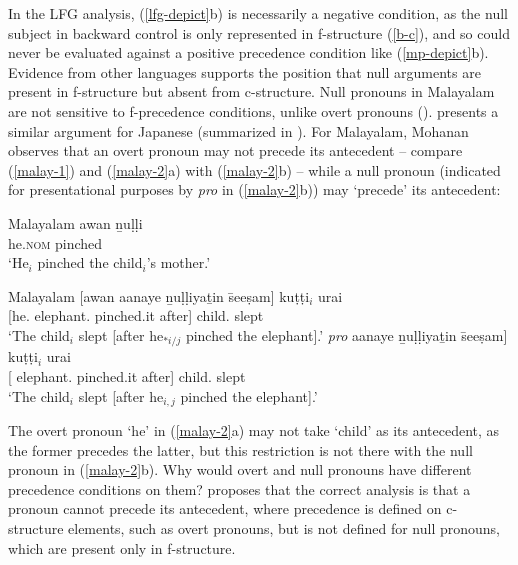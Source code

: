 \documentclass[output=paper,hidelinks]{langscibook}
\begin{document}
In the LFG analysis, (\ref{lfg-depict}b) is necessarily a negative
condition, as the null subject in backward control is only represented
in f-structure (\ref{b-c}), and so could never be evaluated against a
positive precedence condition like (\ref{mp-depict}b). Evidence from other
languages supports the position that null arguments are present in
f-structure but absent from c-structure. Null pronouns in Malayalam
are not sensitive to f-precedence conditions, unlike overt pronouns
(\citealp[664--665]{mohanan83}). \citet{kameyama85} presents a similar
argument for Japanese (summarized in \citealt[171ff.~and
  288ff.]{dalrymple01}). For Malayalam, Mohanan observes that an overt
pronoun may not precede its antecedent -- compare (\ref{malay-1}) and
(\ref{malay-2}a) with (\ref{malay-2}b) -- while a null pronoun (indicated
for presentational purposes by \textit{pro} in (\ref{malay-2}b)) may
`precede' its antecedent:

\ea\label{malay-1} Malayalam
\ea
{} awan \b{n}u\d{l}\d{l}i\\
[child.\textsc{gen} mother.\textsc{acc}] he.\textsc{nom} pinched\\
\glt `He$_i$ pinched the child$_i$’s mother.'
\z\z

\ea\label{malay-2} Malayalam
\ea
\gll
{[}awan  aanaye \b{n}u\d{l}\d{l}iya\b{t}in{\textschwa} \={s}ee\d{s}am]
ku\d{t}\d{t}i{$_i$} ura{\texteng}{\texteng}i\\
{[}he.{\NOM} elephant.{\ACC} pinched.it after] child.{\NOM} slept\\
\glt `The child$_i$ slept [after he$_{*i/j}$ pinched the elephant].'
\ex
\gll {[}\textit{pro} aanaye \b{n}u\d{l}\d{l}iya\b{t}in{\textschwa}
  \={s}ee\d{s}am] ku\d{t}\d{t}i{$_i$} ura{\texteng}{\texteng}i\\
{[} elephant.{\ACC}  pinched.it after] child.{\NOM} slept\\
\glt `The child$_i$ slept [after he$_{i,j}$ pinched the elephant].'
\z\z

The overt pronoun `he' in (\ref{malay-2}a) may not take `child' as its
antecedent, as the former precedes the latter, but this restriction is
not there with the null pronoun in (\ref{malay-2}b). Why would overt and
null pronouns have different precedence conditions on them?
\citet[664]{mohanan83} proposes that the correct analysis is that a
pronoun cannot precede its antecedent, where precedence is defined on
c-structure elements, such as overt pronouns, but is not defined for
null pronouns, which are present only in f-structure.
\end{document}
